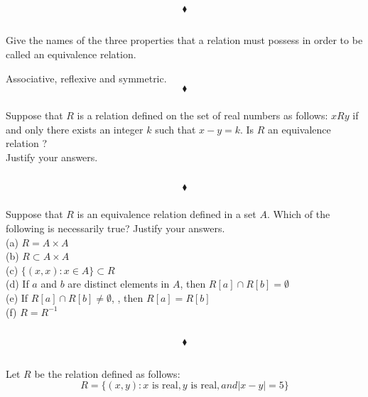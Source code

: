 $$\blacklozenge$$


\renewcommand{\thesubsection}{\thesection.\RomanNumeralCaps{3}}
\subsection{}
\subsubsection{}
\begin{tcolorbox}
Give the names of the three properties that a relation must possess in order to be called an equivalence relation.
\end{tcolorbox}
$$ $$
Associative, reflexive and symmetric.
$$\blacklozenge$$

\subsubsection{}
\begin{tcolorbox}
Suppose that $R$ is a relation defined on the set of real numbers  as follows: $xRy$ if and only there exists an integer $k$ such that $x-y=k$. Is $R$ an equivalence relation ?\\
Justify your answers.
\end{tcolorbox}
$$ $$

$$\blacklozenge$$
\subsubsection{}
\begin{tcolorbox}
Suppose that $R$  is an equivalence relation defined in a set $A$. Which of the following is necessarily true? Justify your answers.\\
(a) $R=A\times A$\\
(b) $R\subset  A \times A$ \\
(c) $\{(x, x):x \in  A\}\subset R$\\
(d) If $a$ and $b$ are distinct elements in $A$, then $R[a]\cap R[b] =\emptyset $\\
(e) If $R[a] \cap  R[b] \neq \emptyset$, , then $R[a]=R[b]$\\
(f) $R= R^{-1}$
\end{tcolorbox}
$$ $$

$$\blacklozenge$$

\renewcommand{\thesubsection}{\thesection.\RomanNumeralCaps{4}}
\subsection{}
Let $R$ be the relation defined as follows: 
$$R = \{(x, y):x \text{ is real}, y \text{ is real}, and |x - y| =5\} $$

